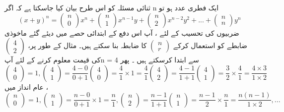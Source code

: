 ثنائی مسئلہ کو اس طرح بیان کیا جاسکتا ہے کہ اگر n ایک فطری عدد ہو تو 
  \[(x+y)^{n}=
     \begin{pmatrix}
     n\\0
     \end{pmatrix}
     x^{n}+
      \begin{pmatrix}
    n\\1
     \end{pmatrix}
     x^{n-1}y+
      \begin{pmatrix}
    n\\2
     \end{pmatrix}
     x^{n-2}y^{2}+...+
      \begin{pmatrix}
    n\\n
     \end{pmatrix}
     y^{n}\]
ضربیوں کی تحسیب کے لئے ، آپ اس دفع کے ابتدائی حصے میں دیئے گئے ماخوذی ضابطے کو استعمال کرکے
\(\begin{pmatrix}
    n\\r
    \end{pmatrix}\)
کا ضابطہ بنا سکتے ہیں۔ مثال کے طور پر، 
\( \begin{pmatrix}
    4\\2
    \end{pmatrix}\)
کی قیمت معلوم کرنے کے لئے آپn = 4 سے ابتدا کرسکتے ہیں ۔ پھر 
  \[  \begin{pmatrix}
    4\\0
     \end{pmatrix}
     =1,
     \begin{pmatrix}
    4\\1
     \end{pmatrix}
     =\frac{4-0}{0+1}
     \begin{pmatrix}
    4\\0
     \end{pmatrix}
     =\frac{4}{1}\times1=\frac{4}{1}
     \begin{pmatrix}
     4\\2
     \end{pmatrix}
     =\frac{4-1}{1+1}
     \begin{pmatrix}
    4\\1
     \end{pmatrix}
     =\frac{3}{2}\times\frac{4}{1}=\frac{4\times3}{1\times2}\]
عام انداز میں ، 
         \[\begin{pmatrix}
     n\\0
     \end{pmatrix}
     =1,
     \begin{pmatrix}
    n\\1
     \end{pmatrix}
     =\frac{n-0}{0+1}\times1=\frac{n}{1},
     \begin{pmatrix}
     n\\2
     \end{pmatrix}
     =\frac{n-1}{1+1}
     \begin{pmatrix}
     n\\1
     \end{pmatrix}
     =\frac{n-1}{2}\times\frac{n}{1}=\frac{n(n-1)}{1\times2},...\]


